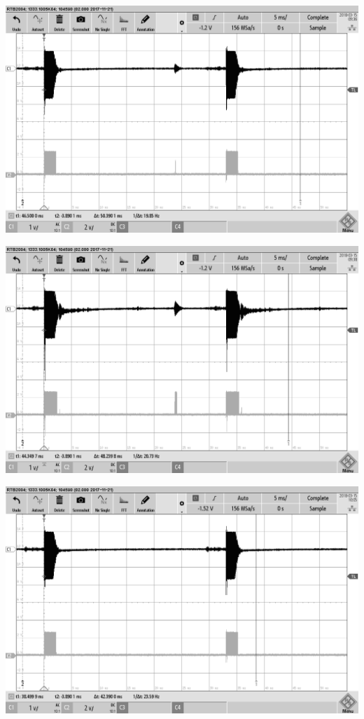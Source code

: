 \begin{minipage}{0.5\textwidth}
\includegraphics[width=1\textwidth%
]{Abbildungen/MessungenP2/5V/4m.PNG}
\end{minipage}
\begin{minipage}{0.5\textwidth}
\includegraphics[width=1\textwidth%
]{Abbildungen/MessungenP2/10V/4m.PNG}
\end{minipage}
\begin{minipage}{0.5\textwidth}
\includegraphics[width=1\textwidth%
]{Abbildungen/MessungenP2/5V/5m.PNG}
\end{minipage}
